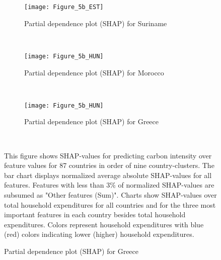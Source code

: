 \begin{figure}[ht!]\ContinuedFloat
    \centering
   \begin{subfigure}[b]{\textwidth}
         \centering
         \caption{Partial dependence plot (SHAP) for Suriname}
         \label{fig:5b_SUR}
         \texttt{[image: Figure\_5b\_EST]}         
     \end{subfigure}
    \\
    \vspace{0.5cm}
   \begin{subfigure}[b]{\textwidth}
         \centering
         \caption{Partial dependence plot (SHAP) for Morocco}
         \label{fig:5b_MAR}
         \texttt{[image: Figure\_5b\_HUN]}         
     \end{subfigure}
    \\
    \vspace{0.5cm}
   \begin{subfigure}[b]{\textwidth}
         \centering
         \caption{Partial dependence plot (SHAP) for Greece}
         \label{fig:5b_GRC}
         \texttt{[image: Figure\_5b\_HUN]}
    \end{subfigure}
    \\
    \vspace{0.5cm}
    \begin{subcaption2}
     This figure shows SHAP-values for predicting carbon intensity over feature values for 87 countries in order of nine country-clusters. The bar chart displays normalized average absolute SHAP-values for all features. Features with less than 3\% of normalized SHAP-values are subsumed as "Other features (Sum)". Charts show SHAP-values over total household expenditures for all countries and for the three most important features in each country besides total household expenditures. Colors represent household expenditures with blue (red) colors indicating lower (higher) household expenditures.
     \end{subcaption2}
\end{figure}

